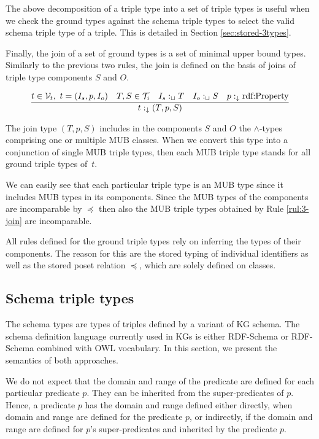 \documentclass[runningheads]{llncs}
\newcommand{\darr}{\downarrow}
\newcommand{\V}{{\cal V}}
\newcommand{\T}{{\cal T}}
\begin{document}
The above decomposition of a triple type into a set of triple types is
useful when we check the ground types against the schema triple types
to select the valid schema triple type of a triple. This is detailed in
Section \ref{sec:stored-3types}.

Finally, the join of a set of ground types is a set of minimal upper
bound types. Similarly to the previous two rules, the join is defined
on the basis of joins of triple type components $S$ and $O$.

\begin{equation}
\label{rul:3-join}
\dfrac{t\in\V_t,\ t=(I_s,p,I_o)\quad T,S\in\T_i\quad I_s:_\sqcup\/T\quad I_o:_\sqcup\/S\quad p:_\darr\text{rdf:Property}}
      {t:_\darr\/(T,p,S)}
\end{equation}

The join type $(T,p,S)$ includes in the components $S$ and $O$ the
$\land$-types comprising one or multiple MUB classes. When we convert
this type into a conjunction of single MUB triple types, then each MUB
triple type stands for all ground triple types of~$t$.

We can easily see that each particular triple type is an MUB type
since it includes MUB types in its components. Since the MUB types of
the components are incomparable by $\preceq$ then also the MUB triple
types obtained by Rule \ref{rul:3-join} are incomparable.

All rules defined for the ground triple types rely on inferring the
types of their components. The reason for this are the stored typing
of individual identifiers as well as the stored poset relation
$\preceq$, which are solely defined on classes.






\subsection{Schema triple types\label{sec:stored-3types}}

The schema types are types of triples defined by a variant of KG
schema. The schema definition language currently used in KGs is either
RDF-Schema \cite{rdfschema} or RDF-Schema combined with OWL
\cite{owl2} vocabulary. In this section, we present the semantics of
both approaches.

We do not expect that the domain and range of the predicate are defined
for each particular predicate $p$. They can be inherited from the
super-predicates of $p$. Hence, a predicate $p$ has the domain and
range defined either directly, when domain and range are defined for
the predicate $p$, or indirectly, if the domain and range are defined
for $p$'s super-predicates and inherited by the predicate $p$.
\end{document}
